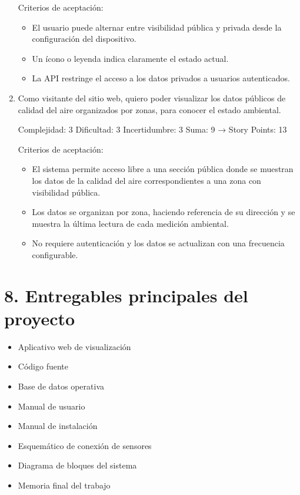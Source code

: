 \documentclass[
11pt, %
]{charter}
\begin{document}
\begin{enumerate}
Criterios de aceptación:
\begin{itemize}
	\item El usuario puede alternar entre visibilidad pública y privada desde la configuración del dispositivo.
	\item Un ícono o leyenda indica claramente el estado actual.
	\item La API restringe el acceso a los datos privados a usuarios autenticados.

\end{itemize}

\item Como visitante del sitio web, quiero poder visualizar los datos públicos de calidad del aire organizados por zonas, para conocer el estado ambiental.

Complejidad: 3
Dificultad: 3
Incertidumbre: 3
Suma: 9 → Story Points: 13

Criterios de aceptación:

\begin{itemize}
	\item El sistema permite acceso libre a una sección pública donde se muestran los datos de la calidad del aire correspondientes a una zona con visibilidad pública.
	\item Los datos se organizan por zona, haciendo referencia de su dirección y se muestra la última lectura de cada medición ambiental.
	\item No requiere autenticación y los datos se actualizan con una frecuencia configurable.

\end{itemize}


\end{enumerate}


\section{8. Entregables principales del proyecto}
\label{sec:entregables}

\begin{itemize}
\item Aplicativo web de visualización

\item Código fuente

\item Base de datos operativa

\item Manual de usuario

\item Manual de instalación

\item Esquemático de conexión de sensores

\item Diagrama de bloques del sistema

\item Memoria final del trabajo

\end{itemize}
\end{document}
